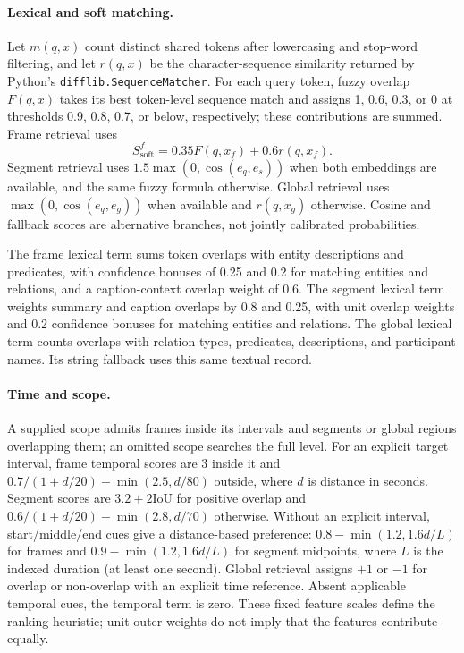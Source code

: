 \paragraph{Lexical and soft matching.}
Let $m(q,x)$ count distinct shared tokens after lowercasing and stop-word filtering, and let $r(q,x)$ be the character-sequence similarity returned by Python's \texttt{difflib.SequenceMatcher}.
For each query token, fuzzy overlap $F(q,x)$ takes its best token-level sequence match and assigns 1, 0.6, 0.3, or 0 at thresholds 0.9, 0.8, 0.7, or below, respectively; these contributions are summed.
Frame retrieval uses
\[
S_{\mathrm{soft}}^f=0.35F(q,x_f)+0.6r(q,x_f).
\]
Segment retrieval uses $1.5\max(0,\cos(e_q,e_s))$ when both embeddings are available, and the same fuzzy formula otherwise.
Global retrieval uses $\max(0,\cos(e_q,e_g))$ when available and $r(q,x_g)$ otherwise.
Cosine and fallback scores are alternative branches, not jointly calibrated probabilities.

The frame lexical term sums token overlaps with entity descriptions and predicates, with confidence bonuses of 0.25 and 0.2 for matching entities and relations, and a caption-context overlap weight of 0.6.
The segment lexical term weights summary and caption overlaps by 0.8 and 0.25, with unit overlap weights and 0.2 confidence bonuses for matching entities and relations.
The global lexical term counts overlaps with relation types, predicates, descriptions, and participant names.
Its string fallback uses this same textual record.

\paragraph{Time and scope.}
A supplied scope admits frames inside its intervals and segments or global regions overlapping them; an omitted scope searches the full level.
For an explicit target interval, frame temporal scores are 3 inside it and $0.7/(1+d/20)-\min(2.5,d/80)$ outside, where $d$ is distance in seconds.
Segment scores are $3.2+2\mathrm{IoU}$ for positive overlap and $0.6/(1+d/20)-\min(2.8,d/70)$ otherwise.
Without an explicit interval, start/middle/end cues give a distance-based preference: $0.8-\min(1.2,1.6d/L)$ for frames and $0.9-\min(1.2,1.6d/L)$ for segment midpoints, where $L$ is the indexed duration (at least one second).
Global retrieval assigns $+1$ or $-1$ for overlap or non-overlap with an explicit time reference.
Absent applicable temporal cues, the temporal term is zero.
These fixed feature scales define the ranking heuristic; unit outer weights do not imply that the features contribute equally.


